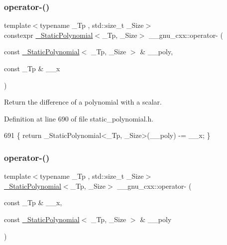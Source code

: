 \subsubsection{\texorpdfstring{operator-\/()}{operator-()}\hspace{0.1cm}{\footnotesize\ttfamily [1/6]}}
{\footnotesize\ttfamily template$<$typename \+\_\+\+Tp , std\+::size\+\_\+t \+\_\+\+Size$>$ \\
constexpr \hyperlink{class____gnu__cxx_1_1__StaticPolynomial}{\+\_\+\+Static\+Polynomial}$<$\+\_\+\+Tp, \+\_\+\+Size$>$ \+\_\+\+\_\+gnu\+\_\+cxx\+::operator-\/ (\begin{DoxyParamCaption}\item[{const \hyperlink{class____gnu__cxx_1_1__StaticPolynomial}{\+\_\+\+Static\+Polynomial}$<$ \+\_\+\+Tp, \+\_\+\+Size $>$ \&}]{\+\_\+\+\_\+poly,  }\item[{const \+\_\+\+Tp \&}]{\+\_\+\+\_\+x }\end{DoxyParamCaption})\hspace{0.3cm}{\ttfamily [inline]}}

Return the difference of a polynomial with a scalar. 

Definition at line 690 of file static\+\_\+polynomial.\+h.


\begin{DoxyCode}
691     \{ \textcolor{keywordflow}{return} \_StaticPolynomial<\_Tp, \_Size>(\_\_poly) -= \_\_x; \}
\end{DoxyCode}
\mbox{\label{namespace____gnu__cxx_a6bc4eecdfefce0b2dea328cb6cc5412a}} 
\subsubsection{\texorpdfstring{operator-\/()}{operator-()}\hspace{0.1cm}{\footnotesize\ttfamily [2/6]}}
{\footnotesize\ttfamily template$<$typename \+\_\+\+Tp , std\+::size\+\_\+t \+\_\+\+Size$>$ \\
\hyperlink{class____gnu__cxx_1_1__StaticPolynomial}{\+\_\+\+Static\+Polynomial}$<$\+\_\+\+Tp, \+\_\+\+Size$>$ \+\_\+\+\_\+gnu\+\_\+cxx\+::operator-\/ (\begin{DoxyParamCaption}\item[{const \+\_\+\+Tp \&}]{\+\_\+\+\_\+x,  }\item[{const \hyperlink{class____gnu__cxx_1_1__StaticPolynomial}{\+\_\+\+Static\+Polynomial}$<$ \+\_\+\+Tp, \+\_\+\+Size $>$ \&}]{\+\_\+\+\_\+poly }\end{DoxyParamCaption})\hspace{0.3cm}{\ttfamily [inline]}}



